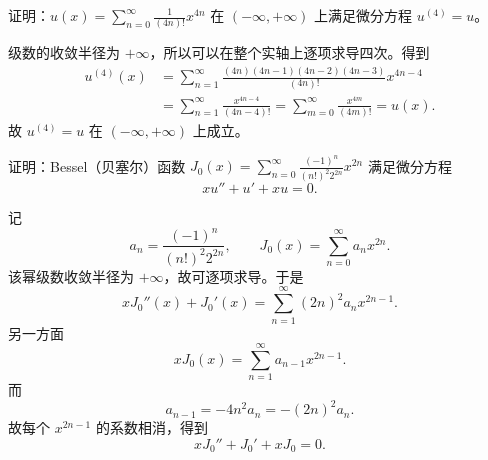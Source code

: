 \begin{xexercise}[7]
证明：$\displaystyle u(x)=\sum_{n=0}^{\infty}\frac1{(4n)!}x^{4n}$ 在 $(-\infty,+\infty)$ 上满足微分方程 $u^{(4)}=u$。
\end{xexercise}
\begin{xsolution}
级数的收敛半径为 $+\infty$，所以可以在整个实轴上逐项求导四次。得到
\[
\begin{aligned}
  u^{(4)}(x)
  &=\sum_{n=1}^{\infty}\frac{(4n)(4n-1)(4n-2)(4n-3)}{(4n)!}x^{4n-4}\\
  &=\sum_{n=1}^{\infty}\frac{x^{4n-4}}{(4n-4)!}
  =\sum_{m=0}^{\infty}\frac{x^{4m}}{(4m)!}=u(x).
\end{aligned}
\]
故 $u^{(4)}=u$ 在 $(-\infty,+\infty)$ 上成立。
\end{xsolution}


\begin{xexercise}[8]
证明：Bessel（贝塞尔）函数 $\displaystyle J_0(x)=\sum_{n=0}^{\infty}\frac{(-1)^n}{(n!)^2 2^{2n}}x^{2n}$ 满足微分方程
  \[
    xu''+u'+xu=0.
  \]
\end{xexercise}
\begin{xsolution}
记
\[
  a_n=\frac{(-1)^n}{(n!)^2 2^{2n}},
  \qquad J_0(x)=\sum_{n=0}^{\infty}a_nx^{2n}.
\]
该幂级数收敛半径为 $+\infty$，故可逐项求导。于是
\[
  xJ_0''(x)+J_0'(x)
  =\sum_{n=1}^{\infty}(2n)^2a_nx^{2n-1}.
\]
另一方面
\[
  xJ_0(x)=\sum_{n=1}^{\infty}a_{n-1}x^{2n-1}.
\]
而
\[
  a_{n-1}=-4n^2a_n=-(2n)^2a_n.
\]
故每个 $x^{2n-1}$ 的系数相消，得到
\[
  xJ_0''+J_0'+xJ_0=0.
\]
\end{xsolution}


